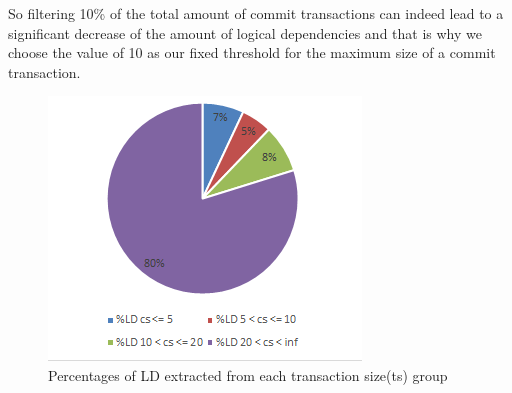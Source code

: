 \documentclass[conference]{IEEEtran}
\begin{document}
So filtering 10\% of the total amount of commit transactions can indeed lead to a significant decrease of the amount of logical dependencies and that is why we choose the value of 10 as our fixed threshold for the maximum size of a commit transaction.


\begin{figure}[h]
\includegraphics[scale=0.9]{fig_ld_ts.png}
\caption{Percentages of LD extracted from each transaction size(ts) group}
\label{fig:fig_ld_ts}
\centering
\end{figure}
\end{document}

